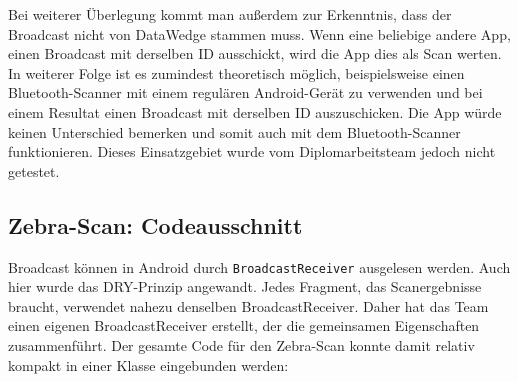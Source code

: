 Bei weiterer Überlegung kommt man außerdem zur Erkenntnis, dass der
Broadcast nicht von DataWedge stammen muss. Wenn eine beliebige andere
App, einen Broadcast mit derselben ID ausschickt, wird die App dies als
Scan werten. In weiterer Folge ist es zumindest theoretisch möglich,
beispielsweise einen Bluetooth-Scanner mit einem regulären Android-Gerät
zu verwenden und bei einem Resultat einen Broadcast mit derselben ID
auszuschicken. Die App würde keinen Unterschied bemerken und somit auch
mit dem Bluetooth-Scanner funktionieren. Dieses Einsatzgebiet wurde vom
Diplomarbeitsteam jedoch nicht getestet.

\hypertarget{zebra-scan-codeausschnitt}{%
\subsection{Zebra-Scan:
Codeausschnitt}\label{zebra-scan-codeausschnitt}}

Broadcast können in Android durch \texttt{BroadcastReceiver} ausgelesen
werden. Auch hier wurde das DRY-Prinzip angewandt. Jedes Fragment, das
Scanergebnisse braucht, verwendet nahezu denselben BroadcastReceiver.
Daher hat das Team einen eigenen BroadcastReceiver erstellt, der die
gemeinsamen Eigenschaften zusammenführt. Der gesamte Code für den
Zebra-Scan konnte damit relativ kompakt in einer Klasse eingebunden
werden:


